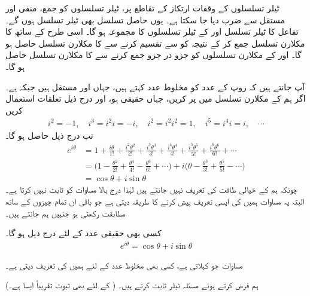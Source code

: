 ٹیلر تسلسلوں کے وقفات ارتکاز کے تقاطع پر، ٹیلر تسلسلوں کو  جمع، منفی اور مستقل سے ضرب دیا جا سکتا ہے۔ یوں حاصل تسلسل بھی ٹیلر تسلسل ہوں گے۔ تفاعل  کا ٹیلر تسلسل  اور  کے ٹیلر تسلسلوں کا مجموعہ ہو گا۔ اسی طرح  کے ساتھ  کا مکلارن تسلسل جمع کر کے نتیجہ کو  سے تقسیم کرنے سے   کا مکلارن تسلسل حاصل ہو گا۔   اور  کے مکلارن تسلسلوں کو جزو در جزو جمع کرنے سے  کا مکلارن تسلسل حاصل ہو گا۔  

آپ جانتے ہیں کہ  روپ کے عدد کو مخلوط عدد کہتے ہیں، جہاں  اور  مستقل ہیں جبکہ  ہے۔ اگر ہم  کے مکلارن تسلسل میں   پر کریں، جہاں  حقیقی ہو، اور درج ذیل تعلقات استعمال کریں
\begin{align*}
i^2=-1,\quad i^3=i^2i=-i,\quad i^2=i^2i^2=1,\quad i^5=i^4i=i,\quad \cdots
\end{align*}
تب درج ذیل حاصل ہو گا۔
\begin{align*}
e^{i\theta}&=1+\frac{i\theta}{1!}+\frac{i^2\theta^2}{2!}+\frac{i^3\theta^3}{3!}+\frac{i^4\theta^4}{4!}+\frac{i^5\theta^5}{5!}+\frac{i^6\theta^6}{6!}+\cdots\\
&=\big(1-\frac{\theta^2}{2!}+\frac{\theta^4}{4!}-\frac{\theta^6}{6!}+\cdots\big)+i\big(\theta-\frac{\theta^3}{3!}+\frac{\theta^5}{5!}-\cdots\big)\\
&=\cos \theta+i\sin \theta
\end{align*}
چونکہ ہم  کے خیالی طاقت کی تعریف نہیں جانتے ہیں لہٰذا درج بالا مساوات  کو ثابت نہیں کرتا ہے۔ البتہ یہ مساوات ہمیں  کی ایسی تعریف پیش کرنے کا طریقہ دیتی ہے جو باقی ان تمام چیزوں کے ساتھ مطابقت رکھتی ہو جنہیں ہم جانتے ہیں۔

کسی بھی حقیقی عدد  کے لئے درج ذیل ہو گا۔
\begin{align}\label{مساوات_تسلسل_کلیہ_یولر_الف}
e^{i\theta}=\cos \theta+i\sin\theta
\end{align}

مساوات  جو  کہلاتی ہے، کسی بھی مخلوط عدد  کے لئے  ہمیں  کی تعریف  دیتی ہے۔ 

ہم  فرض کرتے ہوئے مسئلہ ٹیلر ثابت کرتے ہیں۔ ( کے لئے بھی ثبوت تقریباً ایسا ہے۔)

